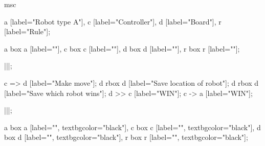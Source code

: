 \begin{msc}
msc
{

a [label="Robot type A"],
c [label="Controller"],
d [label="Board"],
r [label="Rule"];

a box a [label=""],
c box c [label=""],
d box d [label=""],
r box r [label=""];

|||;

c => d [label="Make move"];
d rbox d [label="Save location of robot"];
d rbox d [label="Save which robot wins"];
d >> c [label="WIN"];
c -> a [label="WIN"];

|||;

a box a [label="", textbgcolor="black"],
c box c [label="", textbgcolor="black"],
d box d [label="", textbgcolor="black"],
r box r [label="", textbgcolor="black"];

}
\end{msc}
